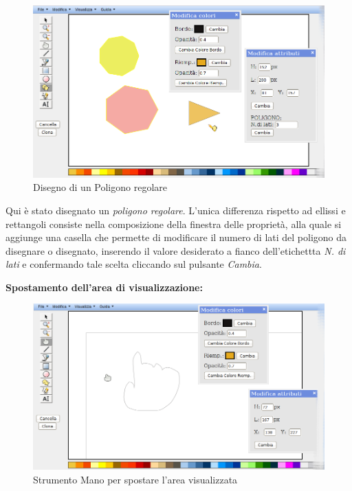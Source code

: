 \begin{figure}[!ht]
\centering
\includegraphics[scale=0.5]{images/poligono.png}
\caption{Disegno di un Poligono regolare}
\end{figure}
 
 
\vspace{50pt}
Qui \`e stato disegnato un \textit{poligono regolare}. L'unica differenza rispetto ad ellissi e rettangoli consiste nella composizione della finestra delle propriet\`a, alla quale si aggiunge una casella che permette di modificare il numero di lati del poligono da disegnare o disegnato, inserendo il valore desiderato a fianco dell'etichettta \textit{N. di lati} e confermando tale scelta cliccando sul pulsante \textit{Cambia}.
 
\newpage
 
\textbf{Spostamento dell'area di visualizzazione:}\\
\begin{figure}[!ht]
\centering
\includegraphics[scale=0.5]{images/mano.png}
\caption{Strumento Mano per spostare l'area visualizzata}
\end{figure}

